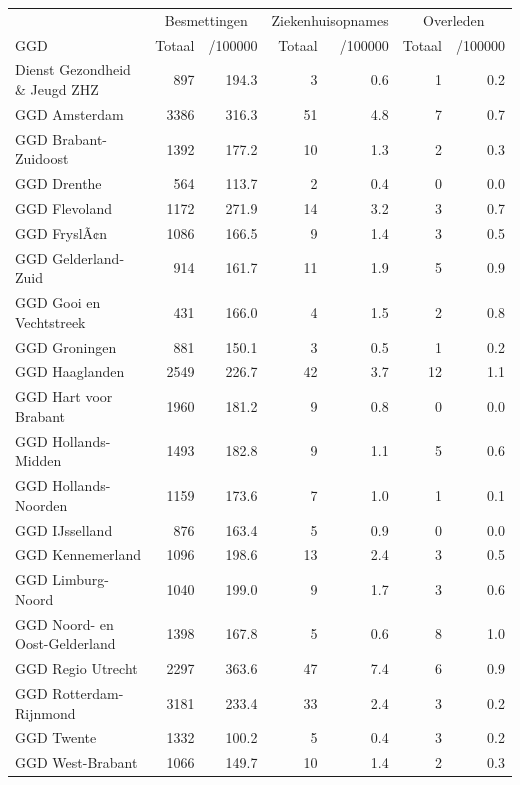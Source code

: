 \documentclass[
  english,
  man,floatsintext]{apa6}
\begin{document}
\begin{table}
\centering\begingroup\fontsize{10}{12}\selectfont

\begin{threeparttable}
\begin{tabular}{lrrrrrr}
\toprule
\multicolumn{1}{c}{ } & \multicolumn{2}{c}{Besmettingen} & \multicolumn{2}{c}{Ziekenhuisopnames} & \multicolumn{2}{c}{Overleden} \\
\cmidrule(l{3pt}r{3pt}){2-3} \cmidrule(l{3pt}r{3pt}){4-5} \cmidrule(l{3pt}r{3pt}){6-7}
GGD & Totaal & /100000 & Totaal & /100000 & Totaal & /100000\\
\midrule
Dienst Gezondheid \& Jeugd ZHZ & 897 & 194.3 & 3 & 0.6 & 1 & 0.2\\
GGD Amsterdam & 3386 & 316.3 & 51 & 4.8 & 7 & 0.7\\
GGD Brabant-Zuidoost & 1392 & 177.2 & 10 & 1.3 & 2 & 0.3\\
GGD Drenthe & 564 & 113.7 & 2 & 0.4 & 0 & 0.0\\
GGD Flevoland & 1172 & 271.9 & 14 & 3.2 & 3 & 0.7\\
GGD FryslÃ¢n & 1086 & 166.5 & 9 & 1.4 & 3 & 0.5\\
GGD Gelderland-Zuid & 914 & 161.7 & 11 & 1.9 & 5 & 0.9\\
GGD Gooi en Vechtstreek & 431 & 166.0 & 4 & 1.5 & 2 & 0.8\\
GGD Groningen & 881 & 150.1 & 3 & 0.5 & 1 & 0.2\\
GGD Haaglanden & 2549 & 226.7 & 42 & 3.7 & 12 & 1.1\\
GGD Hart voor Brabant & 1960 & 181.2 & 9 & 0.8 & 0 & 0.0\\
GGD Hollands-Midden & 1493 & 182.8 & 9 & 1.1 & 5 & 0.6\\
GGD Hollands-Noorden & 1159 & 173.6 & 7 & 1.0 & 1 & 0.1\\
GGD IJsselland & 876 & 163.4 & 5 & 0.9 & 0 & 0.0\\
GGD Kennemerland & 1096 & 198.6 & 13 & 2.4 & 3 & 0.5\\
GGD Limburg-Noord & 1040 & 199.0 & 9 & 1.7 & 3 & 0.6\\
GGD Noord- en Oost-Gelderland & 1398 & 167.8 & 5 & 0.6 & 8 & 1.0\\
GGD Regio Utrecht & 2297 & 363.6 & 47 & 7.4 & 6 & 0.9\\
GGD Rotterdam-Rijnmond & 3181 & 233.4 & 33 & 2.4 & 3 & 0.2\\
GGD Twente & 1332 & 100.2 & 5 & 0.4 & 3 & 0.2\\
GGD West-Brabant & 1066 & 149.7 & 10 & 1.4 & 2 & 0.3\\

\end{tabular}
\end{threeparttable}
\end{table}
\end{document}
